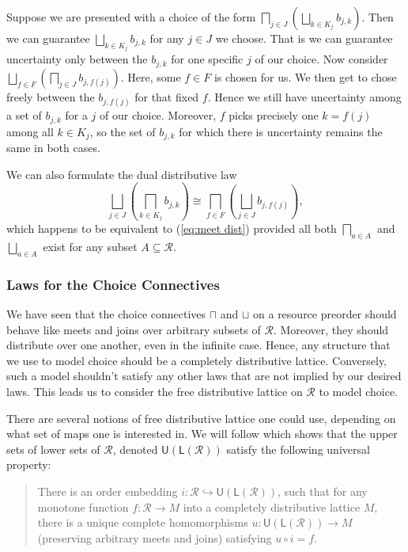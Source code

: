 \documentclass[12pt]{article}
\theoremstyle{definition}
\theoremstyle{plain}
\theoremstyle{plain}
\theoremstyle{plain}
\theoremstyle{plain}
\theoremstyle{remark}
\theoremstyle{remark}
\newcommand{\mc}[1]{\mathcal{#1}}
\newcommand{\sub}{\subseteq}
\newcommand{\low}{\mathsf{L}}
\newcommand{\upper}{\mathsf{U}}
\begin{document}
Suppose we are presented with a choice of the form $\bigsqcap_{j \in J} \left( \bigsqcup_{k \in K_j} b_{j,k} \right)$. Then we can guarantee $\bigsqcup_{k \in K_j} b_{j,k} $ for any $j \in J$ we choose. That is we can guarantee uncertainty only between the $b_{j,k}$ for one specific $j$ of our choice. Now consider $\bigsqcup_{f \in F} \left( \bigsqcap_{j \in J} b_{j,f(j)} \right)$. Here, some $f \in F$ is chosen for us. We then get to chose freely between the $b_{j,f(j)}$ for that fixed $f$. Hence we still have uncertainty among a set of $b_{j,k}$ for a $j$ of our choice. Moreover, $f$ picks precisely one $k = f(j)$ among all $k \in K_j$, so the set of $b_{j,k}$ for which there is uncertainty remains the same in both cases.

We can also formulate the dual distributive law
\begin{equation}
\bigsqcup_{j \in J} \left( \bigsqcap_{k \in K_j} b_{j,k} \right) \cong \bigsqcap_{f \in F} \left( \bigsqcup_{j \in J} b_{j,f(j)} \right),
\end{equation}
which happens to be equivalent to (\ref{eq:meet dist}) provided all both $\bigsqcap_{a \in A}$ and $\bigsqcup_{a \in A}$ exist for any subset $A \sub \mc{R}$.

\subsubsection{Laws for the Choice Connectives}
We have seen that the choice connectives $\sqcap$ and $\sqcup$ on a resource preorder should behave like meets and joins over arbitrary subsets of $\mc{R}$. Moreover, they should distribute over one another, even in the infinite case. Hence, any structure that we use to model choice should be a completely distributive lattice. Conversely, such a model shouldn't satisfy any other laws that are not implied by our desired laws. This leads us to consider the free distributive lattice on $\mc{R}$ to model choice. 

There are several notions of free distributive lattice one could use, depending on what set of maps one is interested in. We will follow \cite{Morris2004} which shows that the upper sets of lower sets of $\mc{R}$, denoted $\upper(\low(\mc{R}))$ satisfy the following universal property:
\begin{quote}
	There is an order embedding $i: \mc{R} \hookrightarrow \upper(\low(\mc{R}))$, such that for any monotone function $f: \mc{R} \rightarrow M$ into a completely distributive lattice $M$, there is a unique complete homomorphisms $u: \upper(\low(\mc{R})) \rightarrow M$ (preserving arbitrary meets and joins) satisfying $u \circ i = f$.
\end{quote}
\end{document}
